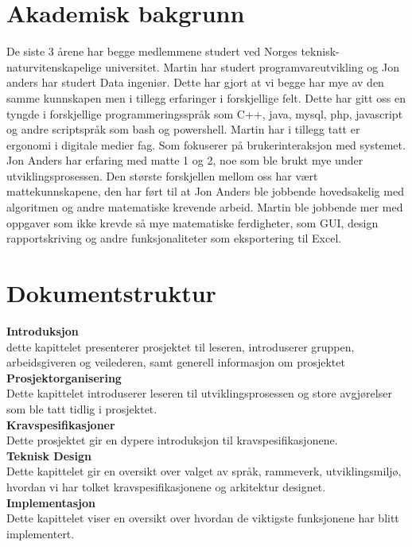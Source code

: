\section{Akademisk bakgrunn}
De siste 3 årene har begge medlemmene studert ved Norges teknisk-naturvitenskapelige universitet. Martin har studert programvareutvikling og Jon anders har studert Data ingeniør. Dette har gjort at vi begge har mye av den samme kunnskapen men i tillegg erfaringer i forskjellige felt. Dette har gitt oss en tyngde i forskjellige programmeringsspråk som C++, java, mysql, php, javascript og andre scriptspråk som bash og powershell. Martin har i tillegg tatt er ergonomi i digitale medier fag. Som fokuserer på brukerinteraksjon med systemet. Jon Anders har erfaring med matte 1 og 2, noe som ble brukt mye under utviklingsprosessen. Den største forskjellen mellom oss har vært mattekunnskapene, den har ført til at Jon Anders ble jobbende hovedsakelig med algoritmen og andre matematiske krevende arbeid. Martin ble jobbende mer med oppgaver som ikke krevde så mye matematiske ferdigheter, som GUI, design rapportskriving og andre funksjonaliteter som eksportering til Excel.



\section{Dokumentstruktur} 

\textbf{Introduksjon}\\
dette kapittelet presenterer prosjektet til leseren, introduserer gruppen, arbeidsgiveren og veilederen, samt generell informasjon om prosjektet\\

\textbf{Prosjektorganisering}\\
Dette kapittelet introduserer leseren til utviklingsprosessen og store avgjørelser som ble tatt tidlig i prosjektet.\\

\textbf{Kravspesifikasjoner}\\
	Dette prosjektet gir en dypere introduksjon til kravspesifikasjonene.\\

\textbf{Teknisk Design}\\
Dette kapittelet gir en oversikt over valget av språk, rammeverk, utviklingsmiljø, hvordan vi har tolket kravspesifikasjonene og arkitektur designet.\\	

\textbf{Implementasjon}\\
Dette kapittelet viser en oversikt over hvordan de viktigste funksjonene har blitt implementert.\\ 


